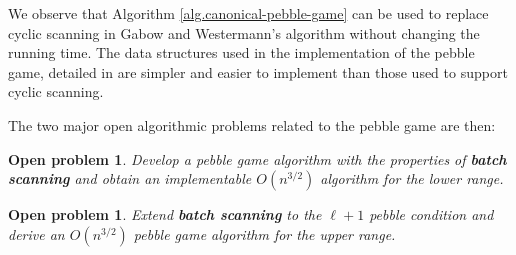 \documentclass[11pt]{article}
\newtheorem{problem}[theorem]{Open problem}
\newcommand{\refalg}[1]{Algorithm \ref{alg.#1}}
\begin{document}
	We observe that \refalg{canonical-pebble-game} can be used to replace cyclic scanning in 
	Gabow and Westermann's algorithm without changing the running time.  The data structures 
	used in the implementation of the pebble game, detailed in \cite{cccg,LeSt05} are 
	simpler and easier to implement than those used to support cyclic scanning.
	
	The two major open algorithmic problems related to the pebble game are then:
	
	\begin{problem}
		Develop a pebble game algorithm with the properties of {\bf batch scanning} and
		obtain an implementable $O(n^{3/2})$ algorithm for the lower range.
	\end{problem}
	
	\begin{problem}
		Extend {\bf batch scanning} to the $\ell+1$ pebble condition and derive an $O(n^{3/2})$
		pebble game algorithm for the upper range.
	\end{problem}

	
	
\end{document}
